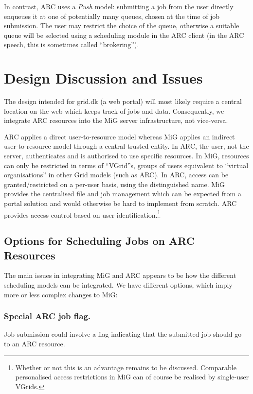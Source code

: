 \documentclass[11pt]{article}
\begin{document}
In contrast, ARC uses a \emph{Push} model: submitting a job from the
user directly enqueues it at one of potentially many queues, chosen at
the time of job submission. The user may restrict the choice of the
queue, otherwise a suitable queue will be selected using a scheduling
module in the ARC client (in the ARC speech, this is sometimes called
``brokering'').


\section{Design Discussion and Issues}

The design intended for grid.dk (a web portal) will most likely
require a central location on the web which keeps track of jobs and
data. Consequently, we integrate ARC resources into the MiG server
infrastructure, not vice-versa.

ARC applies a direct user-to-resource model whereas MiG applies an
indirect user-to-resource model through a central trusted entity.
In ARC, the user,
not the server, authenticates and is authorised to use specific
resources. In MiG, resources can only be restricted in terms of
``VGrid''s, groups of users equivalent to ``virtual organisations'' in
other Grid models (such as ARC). In ARC, access can be
granted/restricted on a per-user basis, using the distinguished name.
%
MiG provides the centralised file and job management which can be
expected from a portal solution and would otherwise be hard to
implement from scratch. ARC provides access control based on user
identification.\footnote{Whether or not this is an advantage remains
  to be discussed. Comparable personalised access restrictions in MiG
  can of course be realised by single-user VGrids.}

\subsection{Options for Scheduling Jobs on ARC Resources}

The main issues in integrating MiG and ARC appears to be how the
different scheduling models can be integrated.
We have different
options, which imply more or less complex changes to MiG:

\subsubsection{Special ARC job flag.}
\label{ARCflag}
 Job submission could involve a flag indicating that the
    submitted job should go to an ARC resource.
\end{document}
